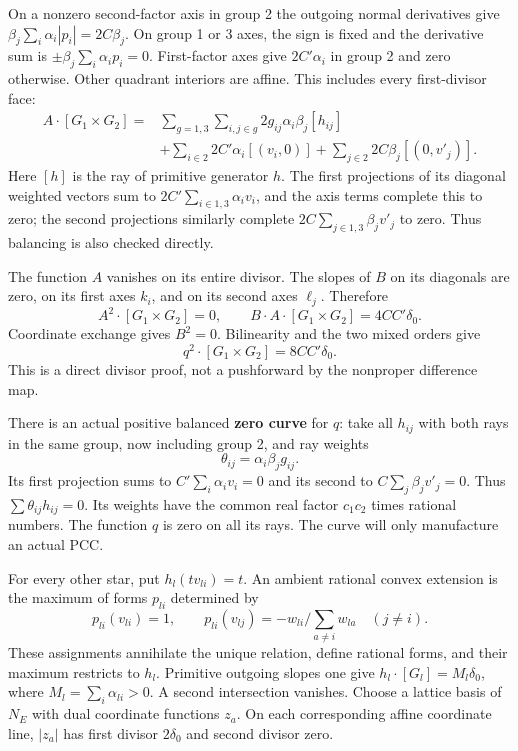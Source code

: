 \documentclass[
  11pt,
]{article}
\begin{document}
On a nonzero second-factor axis in group 2 the outgoing normal
derivatives give \(\beta_j\sum_i\alpha_i|p_i|=2C\beta_j\). On group 1 or
3 axes, the sign is fixed and the derivative sum is
\(\pm\beta_j\sum_i\alpha_ip_i=0\). First-factor axes give
\(2C'\alpha_i\) in group 2 and zero otherwise. Other quadrant interiors
are affine. This includes every first-divisor face: \[
\begin{split}
A\cdot[G_1\times G_2]={}&
\sum_{g=1,3}\sum_{i,j\in g}2g_{ij}\alpha_i\beta_j[h_{ij}]\\
&+\sum_{i\in2}2C'\alpha_i[(v_i,0)]
+\sum_{j\in2}2C\beta_j[(0,v'_j)].
\end{split}
\tag{D1}
\] Here \([h]\) is the ray of primitive generator \(h\). The first
projections of its diagonal weighted vectors sum to
\(2C'\sum_{i\in1,3}\alpha_iv_i\), and the axis terms complete this to
zero; the second projections similarly complete
\(2C\sum_{j\in1,3}\beta_jv'_j\) to zero. Thus balancing is also checked
directly.

The function \(A\) vanishes on its entire divisor. The slopes of \(B\)
on its diagonals are zero, on its first axes \(k_i\), and on its second
axes \(\ell_j\). Therefore \[
A^2\cdot[G_1\times G_2]=0,\qquad
B\cdot A\cdot[G_1\times G_2]=4CC'\delta_0.
\] Coordinate exchange gives \(B^2=0\). Bilinearity and the two mixed
orders give \[
q^2\cdot[G_1\times G_2]=8CC'\delta_0.
\tag{D2}
\] This is a direct divisor proof, not a pushforward by the nonproper
difference map.

There is an actual positive balanced \textbf{zero curve} for \(q\): take
all \(h_{ij}\) with both rays in the same group, now including group 2,
and ray weights \[
\theta_{ij}=\alpha_i\beta_jg_{ij}.
\tag{Z}
\] Its first projection sums to \(C'\sum_i\alpha_iv_i=0\) and its second
to \(C\sum_j\beta_jv'_j=0\). Thus \(\sum\theta_{ij}h_{ij}=0\). Its
weights have the common real factor \(c_1c_2\) times rational numbers.
The function \(q\) is zero on all its rays. The curve will only
manufacture an actual PCC.

For every other star, put \(h_l(tv_{li})=t\). An ambient rational convex
extension is the maximum of forms \(p_{li}\) determined by \[
p_{li}(v_{li})=1,\qquad
p_{li}(v_{lj})=-w_{li}/\sum_{a\ne i}w_{la}\quad(j\ne i).
\] These assignments annihilate the unique relation, define rational
forms, and their maximum restricts to \(h_l\). Primitive outgoing slopes
one give \(h_l\cdot[G_l]=M_l\delta_0\), where
\(M_l=\sum_i\alpha_{li}>0\). A second intersection vanishes. Choose a
lattice basis of \(N_E\) with dual coordinate functions \(z_a\). On each
corresponding affine coordinate line, \(|z_a|\) has first divisor
\(2\delta_0\) and second divisor zero.
\end{document}
